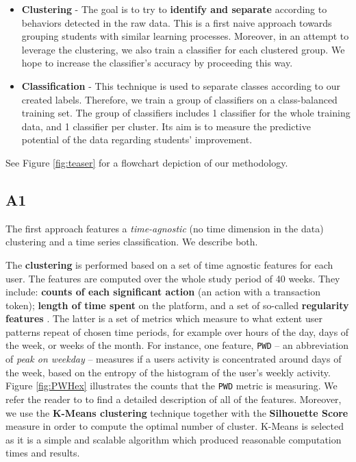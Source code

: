 \documentclass[sigplan,screen]{acmart}
\begin{document}
\begin{itemize}
    \item \textbf{Clustering} - The goal is to try to \textbf{identify and separate} according to behaviors detected in the raw data. This is a first naive approach towards grouping students with similar learning processes. Moreover, in an attempt to leverage the clustering, we also train a classifier for each clustered group. We hope to increase the classifier's accuracy by proceeding this way.
    \item \textbf{Classification} - This technique is used to separate classes according to our created labels. Therefore, we train a group of classifiers on a class-balanced training set. The group of classifiers includes 1 classifier for the whole training data, and 1 classifier per cluster. Its aim is to measure the predictive potential of the data regarding students' improvement. %
\end{itemize}

See Figure \ref{fig:teaser} for a flowchart depiction of our methodology. 

\subsection{A1}\label{subsec:A1}

The first approach features a \textit{time-agnostic} (no time dimension in the data) clustering and a time series classification. We describe both.

The \textbf{clustering} is performed based on a set of time agnostic features for each user. The features are computed over the whole study period of 40 weeks. They include: \textbf{counts of each significant action} (an action with a transaction token); \textbf{length of time spent} on the platform, and a set of so-called \textbf{regularity features} \cite{quantifyreg}. The latter is a set of metrics which measure to what extent user patterns repeat of chosen time periods, for example over hours of the day, days of the week, or weeks of the month. For instance, one feature, \texttt{PWD} -- an abbreviation of \textit{peak on weekday} -- measures if a users activity is concentrated around days of the week, based on the entropy of the histogram of the user's weekly activity. Figure \ref{fig:PWHex} illustrates the counts that the \texttt{PWD} metric is measuring. We refer the reader to \cite{quantifyreg} to find a detailed description of all of the features. Moreover, we use the \textbf{K-Means clustering} technique together with the \textbf{Silhouette Score} measure in order to compute the optimal number of cluster. K-Means is selected as it is a simple and scalable algorithm which produced reasonable computation times and results.
\end{document}
